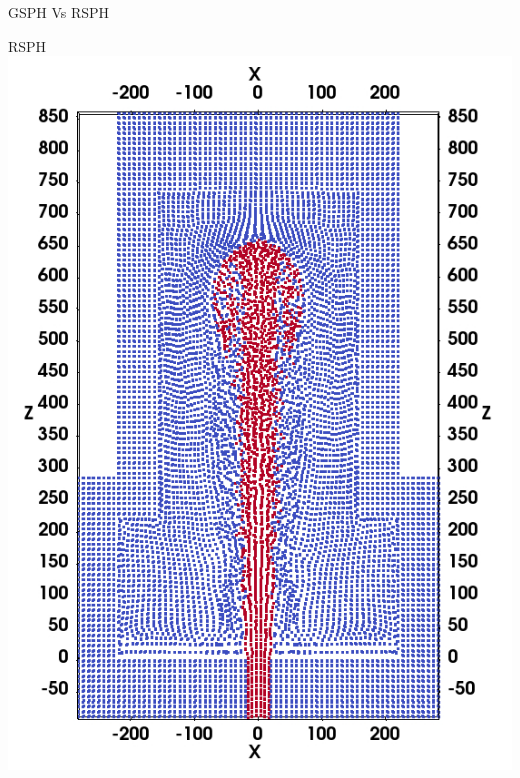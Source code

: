 \documentclass{beamer}
\begin{document}
\begin{frame}{GSPH Vs RSPH}
\begin{minipage}{0.64 \textwidth}
\begin{minipage}[b][][b]{.49 \textwidth}
    \end{minipage}%
    \centering
    \begin{minipage}[b][][b]{.49 \textwidth}
        \centering \small{RSPH}
        \includegraphics[width=0.99 \textwidth]{./Chapter-4/Figures/RSPH-t3-cutView}
    \end{minipage}%
\end{minipage} 
\end{frame}
\end{document}
